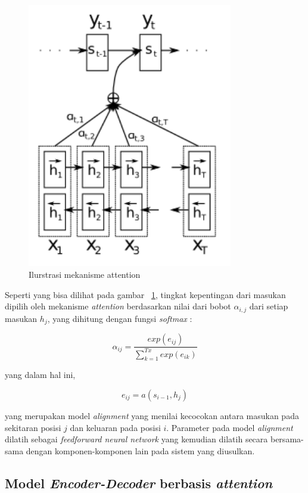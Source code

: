 \begin{figure}[h]
    \centering
    \includegraphics[width=0.8\textwidth]{resources/images/mekanisme-attention.png}
    \caption{Ilurstrasi mekanisme attention \parencite{Bahdanau2015}}
    \label{fig:attention}
\end{figure}

Seperti yang bisa dilihat pada gambar ~\ref{fig:attention}, tingkat kepentingan dari masukan dipilih oleh mekanisme \textit{attention} berdasarkan nilai dari bobot \(\alpha_{i,j}\) dari setiap masukan \(h_{j}\), yang dihitung dengan fungsi \textit{softmax} \parencite{Bahdanau2015}:

\[
    \alpha_{ij} = \frac{exp(e_{ij})}{\displaystyle\sum_{k=1}^{T_{}x} exp(e_{ik})}
\]

yang dalam hal ini,

\[
    e_{ij} = a(s_{i-1}, h_{j})
\]

yang merupakan model \textit{alignment} yang menilai kecocokan antara masukan pada sekitaran posisi \(j\) dan keluaran pada posisi \(i\). Parameter pada model \textit{alignment}  dilatih sebagai \textit{feedforward neural network} yang kemudian dilatih secara bersama-sama dengan komponen-komponen lain pada sistem yang diusulkan.


\subsection{Model \textit{Encoder-Decoder} berbasis \textit{attention}}

